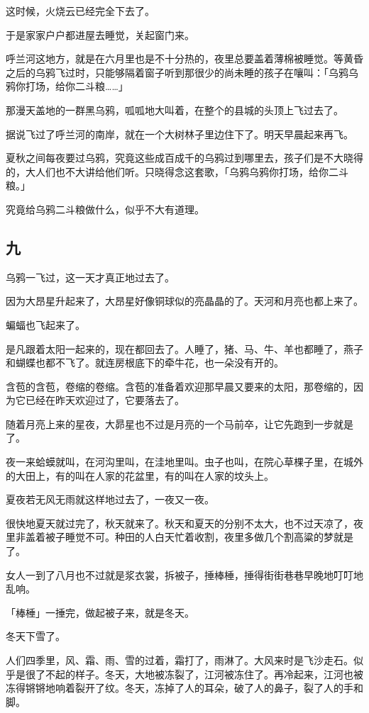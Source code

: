 \documentclass[UTF8]{ctexart}
\begin{document}
这时候，火烧云已经完全下去了。

于是家家户户都进屋去睡觉，关起窗门来。

呼兰河这地方，就是在六月里也是不十分热的，夜里总要盖着薄棉被睡觉。等黄昏之后的乌鸦飞过时，只能够隔着窗子听到那很少的尚未睡的孩子在嚷叫：「乌鸦乌鸦你打场，给你二斗粮……」

那漫天盖地的一群黑乌鸦，呱呱地大叫着，在整个的县城的头顶上飞过去了。

据说飞过了呼兰河的南岸，就在一个大树林子里边住下了。明天早晨起来再飞。

夏秋之间每夜要过乌鸦，究竟这些成百成千的乌鸦过到哪里去，孩子们是不大晓得的，大人们也不大讲给他们听。只晓得念这套歌，「乌鸦乌鸦你打场，给你二斗粮。」

究竟给乌鸦二斗粮做什么，似乎不大有道理。

\subsection{九}

乌鸦一飞过，这一天才真正地过去了。

因为大昂星升起来了，大昂星好像铜球似的亮晶晶的了。天河和月亮也都上来了。

蝙蝠也飞起来了。

是凡跟着太阳一起来的，现在都回去了。人睡了，猪、马、牛、羊也都睡了，燕子和蝴蝶也都不飞了。就连房根底下的牵牛花，也一朵没有开的。

含苞的含苞，卷缩的卷缩。含苞的准备着欢迎那早晨又要来的太阳，那卷缩的，因为它已经在昨天欢迎过了，它要落去了。

随着月亮上来的星夜，大昴星也不过是月亮的一个马前卒，让它先跑到一步就是了。

夜一来蛤蟆就叫，在河沟里叫，在洼地里叫。虫子也叫，在院心草棵子里，在城外的大田上，有的叫在人家的花盆里，有的叫在人家的坟头上。

夏夜若无风无雨就这样地过去了，一夜又一夜。

很快地夏天就过完了，秋天就来了。秋天和夏天的分别不太大，也不过天凉了，夜里非盖着被子睡觉不可。种田的人白天忙着收割，夜里多做几个割高粱的梦就是了。

女人一到了八月也不过就是浆衣裳，拆被子，捶棒棰，捶得街街巷巷早晚地叮叮地乱响。

「棒棰」一捶完，做起被子来，就是冬天。

冬天下雪了。

人们四季里，风、霜、雨、雪的过着，霜打了，雨淋了。大风来时是飞沙走石。似乎是很了不起的样子。冬天，大地被冻裂了，江河被冻住了。再冷起来，江河也被冻得锵锵地响着裂开了纹。冬天，冻掉了人的耳朵，破了人的鼻子，裂了人的手和脚。
\end{document}
